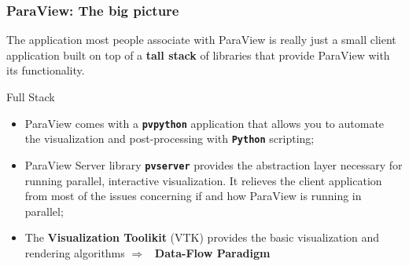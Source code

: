 \documentclass[]{beamer}
\begin{document}

\begin{frame}
\frametitle{ParaView: The big picture}
The application most people associate with ParaView is really just a small client application built on top of a {\bf tall stack} of libraries that provide ParaView with its functionality.
      \begin{block}{Full Stack}
        \begin{itemize}
            \item \small ParaView comes with a \textbf{\texttt{pvpython}} application that allows you to automate the visualization and post-processing with \textbf{\texttt{Python}} scripting;
            \item \small ParaView Server library \textbf{\texttt{pvserver}} provides the abstraction layer necessary for running parallel, interactive visualization. It relieves the client application from most of the issues concerning if and how ParaView is running in parallel;
            \item \small The \textbf{Visualization Toolikit} (VTK) provides the basic visualization and rendering algorithms $\Rightarrow$~ \textbf{Data-Flow Paradigm}
        \end{itemize}
    \end{block}
\end{frame}

\end{document}
